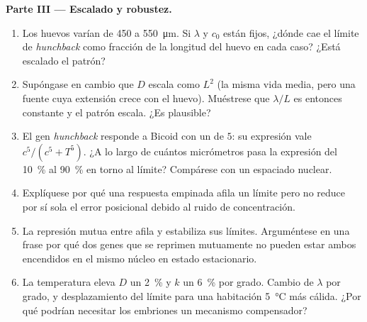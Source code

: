 \begin{problem}
\medskip
\noindent\textbf{Parte III --- Escalado y robustez.}
\begin{enumerate}[resume]
  \item Los huevos varían de \qty{450}{} a \qty{550}{\micro m}. Si
        $\lambda$ y $c_{0}$ están fijos, ¿dónde cae el límite de
        \emph{hunchback} como fracción de la longitud del huevo en cada
        caso? ¿Está escalado el patrón?
  \item Supóngase en cambio que $D$ escala como $L^{2}$ (la misma vida
        media, pero una fuente cuya extensión crece con el huevo).
        Muéstrese que $\lambda/L$ es entonces constante y el patrón
        escala. ¿Es plausible?
  \item El gen \emph{hunchback} responde a Bicoid con un  de $5$: su expresión vale $c^{5}/(c^{5} + T^{5})$. ¿A lo
        largo de cuántos micrómetros pasa la expresión del \qty{10}{\%}
        al \qty{90}{\%} en torno al límite? Compárese con un espaciado
        nuclear.
  \item Explíquese por qué una respuesta empinada afila un límite pero
        no reduce por sí sola el error posicional debido al ruido de
        concentración.
  \item La represión mutua entre  afila y estabiliza sus
        límites. Arguméntese en una frase por qué dos genes que se
        reprimen mutuamente no pueden estar ambos encendidos en el mismo
        núcleo en estado estacionario.
  \item La temperatura eleva $D$ un \qty{2}{\%} y $k$ un \qty{6}{\%} por
        grado. Cambio de $\lambda$ por grado, y desplazamiento del
        límite para una habitación \qty{5}{\celsius} más cálida. ¿Por
        qué podrían necesitar los embriones un mecanismo compensador?
\end{enumerate}


\end{problem}
